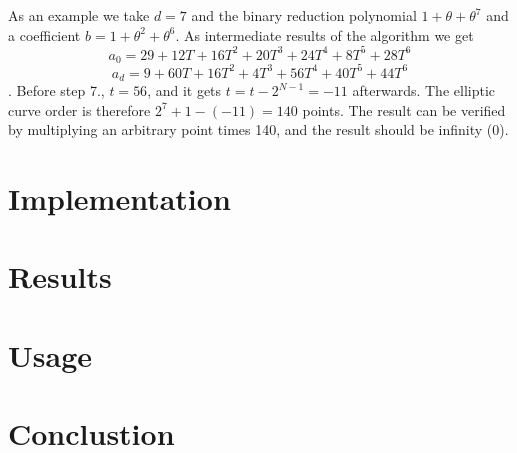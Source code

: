 \documentclass[11pt,english]{article}
\begin{document}
As an example we take $d=7$ and the binary reduction polynomial $1+\theta+\theta^7$ and a coefficient $b=1+\theta^2+\theta^6$. As intermediate results of the algorithm we get 
\begin{displaymath}a_0=29+12T+16T^2+20T^3+24T^4+8T^5+28T^6\end{displaymath}
\begin{displaymath}a_d=9+60T+16T^2+4T^3+56T^4+40T^5+44T^6\end{displaymath}.
Before step 7., $t=56$, and it gets $t=t-2^{N-1}=-11$ afterwards. The elliptic curve order is therefore $2^7+1-(-11)=140$ points. The result can be verified by multiplying an arbitrary point times 140, and the result should be infinity ($0$).

\section{Implementation}
\section{Results}
\section{Usage}
\section{Conclustion}



\end{document}
